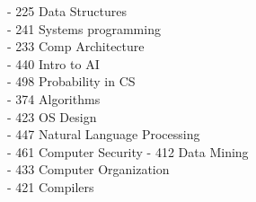 \documentclass[letterpaper,10pt]{article}
\begin{document}
\begin{minipage}[t][0em][t]{0.2\textwidth}
\begin{flushleft}
{%
- 225 Data Structures\\ 
- 241 Systems programming\\ 
- 233 Comp Architecture\\
- 440 Intro to AI\\
- 498 Probability in CS\\
- 374 Algorithms\\
- 423 OS Design\\
- 447 Natural Language Processing\\
- 461 Computer Security
- 412 Data Mining\\  
- 433 Computer Organization\\
- 421 Compilers\\

    }\end{flushleft}
\end{minipage}\hspace{0.5cm}
\end{document}
